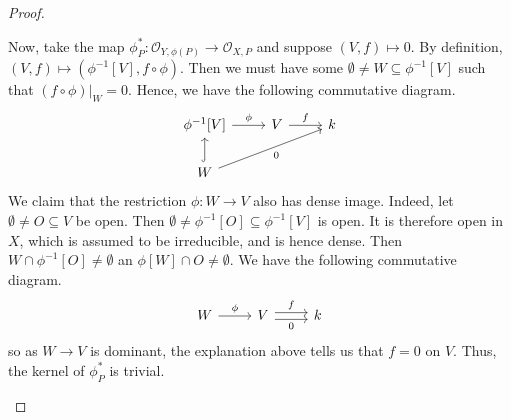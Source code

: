 \begin{proof}
\begin{enumerate}[label = (\alph*)]
        Now, take the map $\phi_P^*: \mathcal O_{Y, \phi(P)} \longrightarrow \mathcal O_{X, P}$ and suppose $(V, f) \mapsto 0$. By definition, $(V, f) \mapsto (\phi^{-1}[V], f \circ \phi)$. Then we must have some $\emptyset \neq W \subseteq \phi^{-1}[V]$ such that $(f \circ \phi)|_W = 0$. Hence, we have the following commutative diagram.
        \[
            \begin{tikzcd}
                \phi^{-1}[V] \arrow[r, "\phi"] & V \arrow[r, "f"] & k\\
                W \arrow[u, hook] \arrow[rru, "0", swap]
            \end{tikzcd}
        \]
        We claim that the restriction $\phi: W \longrightarrow V$ also has dense image. Indeed, let $\emptyset \neq O \subseteq V$ be open. Then $\emptyset \neq \phi^{-1}[O] \subseteq \phi^{-1}[V]$ is open. It is therefore open in $X$, which is assumed to be irreducible, and is hence dense. Then $W \cap \phi^{-1}[O] \neq \emptyset$ an $\phi[W] \cap O \neq \emptyset$. We have the following commutative diagram.
        \[
            \begin{tikzcd}
                W \arrow[r, "\phi"] & V \arrow[r, "0", swap, shift right] \arrow[r, "f", shift left] & k
            \end{tikzcd}
        \]
        so as $W \longrightarrow V$ is dominant, the explanation above tells us that $f = 0$ on $V$. Thus, the kernel of $\phi_P^*$ is trivial.
    \end{enumerate}
\end{proof}
